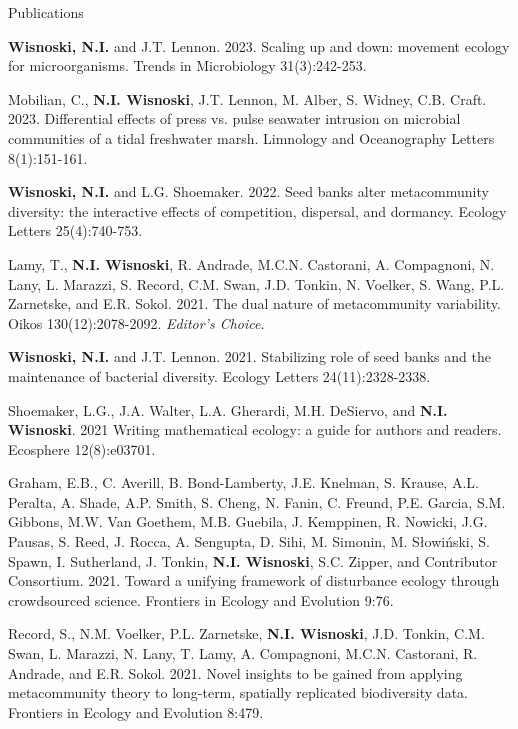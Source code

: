 \documentclass{resume} %
\begin{document}
\begin{rSection}{Publications}
\begin{etaremune}
\item {\bf Wisnoski, N.I.} and J.T. Lennon. 2023. Scaling up and down: movement ecology for microorganisms. Trends in Microbiology 31(3):242-253.

\item Mobilian, C., {\bf N.I. Wisnoski}, J.T. Lennon, M. Alber, S. Widney, C.B. Craft. 2023. Differential effects of press vs. pulse seawater intrusion on microbial communities of a tidal freshwater marsh. Limnology and Oceanography Letters 8(1):151-161.

\item {\bf Wisnoski, N.I.} and L.G. Shoemaker. 2022. Seed banks alter metacommunity diversity: the interactive effects of competition, dispersal, and dormancy. Ecology Letters 25(4):740-753.

\item Lamy, T., {\bf N.I. Wisnoski}, R. Andrade, M.C.N. Castorani, A. Compagnoni, N. Lany, L. Marazzi, S. Record, C.M. Swan, J.D. Tonkin, N. Voelker, S. Wang, P.L. Zarnetske, and E.R. Sokol. 2021. The dual nature of metacommunity variability. Oikos 130(12):2078-2092. {\em Editor's Choice}.

\item {\bf Wisnoski, N.I.} and J.T. Lennon. 2021. Stabilizing role of seed banks and the maintenance of bacterial diversity. Ecology Letters 24(11):2328-2338.

\item Shoemaker, L.G., J.A. Walter, L.A. Gherardi, M.H. DeSiervo, and {\bf N.I. Wisnoski}. 2021 Writing mathematical ecology: a guide for authors and readers. Ecosphere 12(8):e03701.

\item Graham, E.B., C. Averill, B. Bond-Lamberty, J.E. Knelman, S. Krause, A.L. Peralta, A. Shade, A.P. Smith, S. Cheng, N. Fanin, C. Freund, P.E. Garcia, S.M. Gibbons, M.W. Van Goethem, M.B. Guebila, J. Kemppinen, R. Nowicki, J.G. Pausas, S. Reed, J. Rocca, A. Sengupta, D. Sihi, M. Simonin, M. Słowiński, S. Spawn, I. Sutherland, J. Tonkin, {\bf N.I. Wisnoski}, S.C. Zipper, and Contributor Consortium. 2021. Toward a unifying framework of disturbance ecology through crowdsourced science. Frontiers in Ecology and Evolution 9:76.

\item Record, S., N.M. Voelker, P.L. Zarnetske, {\bf N.I. Wisnoski}, J.D. Tonkin, C.M. Swan, L. Marazzi, N. Lany, T. Lamy, A. Compagnoni, M.C.N. Castorani, R. Andrade, and E.R. Sokol. 2021. Novel insights to be gained from applying metacommunity theory to long-term, spatially replicated biodiversity data. Frontiers in Ecology and Evolution 8:479.


\end{etaremune}
\end{rSection}
\end{document}
